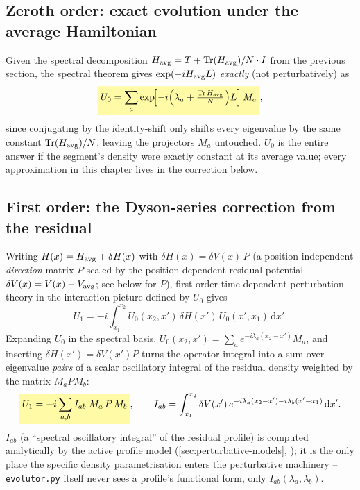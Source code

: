 
\begin{theorybox}
\subsection*{Zeroth order: exact evolution under the average Hamiltonian}
Given the spectral decomposition $H_{\rm avg}=T+\Tr(H_{\rm avg})/N\cdot I$
from the previous section, the spectral theorem gives $\exp(-iH_{\rm avg}L)$
\emph{exactly} (not perturbatively) as
\begin{equation}
  \keyresult{U_0 = \sum_a \exp\!\Bigl[-i\Bigl(\lambda_a+\tfrac{\Tr H_{\rm avg}}{N}\Bigr)L\Bigr]\,M_a},
\end{equation}
since conjugating by the identity-shift only shifts every eigenvalue by the
same constant $\Tr(H_{\rm avg})/N$, leaving the projectors $M_a$
untouched. $U_0$ is the entire answer if the segment's density were exactly
constant at its average value; every approximation in this chapter lives
in the correction below.

\subsection*{First order: the Dyson-series correction from the residual}
Writing $H(x)=H_{\rm avg}+\delta H(x)$ with $\delta H(x)=\delta V(x)\,P$ (a
position-independent \emph{direction} matrix $P$ scaled by the
position-dependent residual potential $\delta V(x)=V(x)-V_{\rm avg}$; see
below for $P$), first-order time-dependent perturbation theory in the
interaction picture defined by $U_0$ gives
\begin{equation}
  U_1 = -i\int_{x_1}^{x_2} U_0(x_2,x')\,\delta H(x')\,U_0(x',x_1)\,\mathrm{d}x'.
\end{equation}
Expanding $U_0$ in the spectral basis, $U_0(x_2,x')=\sum_a
e^{-i\lambda_a(x_2-x')}M_a$, and inserting $\delta H(x')=\delta V(x')P$
turns the operator integral into a sum over eigenvalue \emph{pairs} of a
scalar oscillatory integral of the residual density weighted by the matrix
$M_aPM_b$:
\begin{equation}
  \keyresult{U_1 = -i\sum_{a,b} I_{ab}\;M_a\,P\,M_b},
  \qquad
  I_{ab} = \int_{x_1}^{x_2}\delta V(x')\,e^{-i\lambda_a(x_2-x')-i\lambda_b(x'-x_1)}\,\mathrm{d}x'.
\end{equation}
$I_{ab}$ (a ``spectral oscillatory integral'' of the residual profile) is
computed analytically by the active profile model
(\cref{sec:perturbative-models}, ); it is the
only place the specific density parametrisation enters the perturbative
machinery -- \texttt{evolutor.py} itself never sees a profile's functional
form, only $I_{ab}(\lambda_a,\lambda_b)$.


\end{theorybox}

